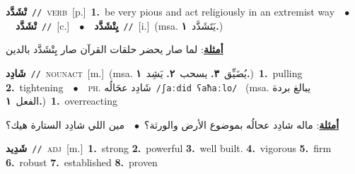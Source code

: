 \documentclass[10pt,a4paper,twoside]{article} %
\begin{document}
\begin{multicols}{2}
{\setlength\topsep{0pt}\textbf{\foreignlanguage{arabic}{تْشَدَّد}}\ {\color{gray}\texttt{//}\color{black}}\ \textsc{verb}\ [p.]\ \textbf{1.}~be very pious and act religiously in an extremist way\ \ $\bullet$\ \ \setlength\topsep{0pt}\textbf{\foreignlanguage{arabic}{تْشَدَّد}}\ {\color{gray}\texttt{//}\color{black}}\ [c.]\ \ $\bullet$\ \ \setlength\topsep{0pt}\textbf{\foreignlanguage{arabic}{يِتْشَدَّد}}\ {\color{gray}\texttt{//}\color{black}}\ [i.]\ \color{gray}(msa. \foreignlanguage{arabic}{يَتَشَدَّد}~\foreignlanguage{arabic}{\textbf{١.}})\color{black}\  \begin{flushright}\color{gray}\foreignlanguage{arabic}{\textbf{\underline{\foreignlanguage{arabic}{أمثلة}}}: لما صار يحضر حلقات القرآن صار يِتْشَدَّد بالدين}\end{flushright}\color{black}} \vspace{2mm}

{\setlength\topsep{0pt}\textbf{\foreignlanguage{arabic}{شَادِد}}\ {\color{gray}\texttt{//}\color{black}}\ \textsc{noun\textunderscore act}\ [m.]\ \color{gray}(msa. \foreignlanguage{arabic}{يُضَيِّق}~\foreignlanguage{arabic}{\textbf{٣.}}  \foreignlanguage{arabic}{يسحب}~\foreignlanguage{arabic}{\textbf{٢.}}  \foreignlanguage{arabic}{يَشِد}~\foreignlanguage{arabic}{\textbf{١.}})\color{black}\ \textbf{1.}~pulling  \textbf{2.}~tightening\ \ $\bullet$\ \ \textsc{ph.} \color{gray} \foreignlanguage{arabic}{شَادِد عحَالُه}\color{black}\ {\color{gray}\texttt{/{\sffamily ʃaːdid ʕaħaːlo}/}\color{black}}\ \color{gray} (msa. \foreignlanguage{arabic}{يبالغ بردة الفعل}~\foreignlanguage{arabic}{\textbf{١.}})\color{black}\ \textbf{1.}~overreacting\  \begin{flushright}\color{gray}\foreignlanguage{arabic}{\textbf{\underline{\foreignlanguage{arabic}{أمثلة}}}: ماله شادِد عحالُه بموضوع الأرض والورثة؟\ $\bullet$\ \  مين اللي شادِد الستارة هيك؟}\end{flushright}\color{black}} \vspace{2mm}

{\setlength\topsep{0pt}\textbf{\foreignlanguage{arabic}{شَدِيد}}\ {\color{gray}\texttt{//}\color{black}}\ \textsc{adj}\ [m.]\ \textbf{1.}~strong  \textbf{2.}~powerful  \textbf{3.}~well built.  \textbf{4.}~vigorous  \textbf{5.}~firm  \textbf{6.}~robust  \textbf{7.}~established  \textbf{8.}~proven\ } \vspace{2mm}


\end{multicols}
\end{document}
